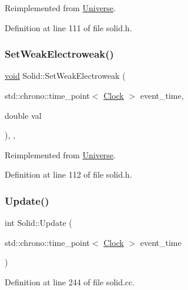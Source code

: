 Reimplemented from \mbox{\hyperlink{class_universe_a0f5cd04081b41ee931c0557dc397f6fb}{Universe}}.



Definition at line 111 of file solid.\+h.

\mbox{\label{class_solid_adb34befc66f8c681f3a85c44e0d00e3a}} 
\subsubsection{\texorpdfstring{Set\+Weak\+Electroweak()}{SetWeakElectroweak()}}
{\footnotesize\ttfamily \mbox{\hyperlink{glad_8h_a950fc91edb4504f62f1c577bf4727c29}{void}} Solid\+::\+Set\+Weak\+Electroweak (\begin{DoxyParamCaption}\item[{std\+::chrono\+::time\+\_\+point$<$ \mbox{\hyperlink{universe_8h_a0ef8d951d1ca5ab3cfaf7ab4c7a6fd80}{Clock}} $>$}]{event\+\_\+time,  }\item[{double}]{val }\end{DoxyParamCaption})\hspace{0.3cm}{\ttfamily [inline]}, {\ttfamily [final]}, {\ttfamily [virtual]}}



Reimplemented from \mbox{\hyperlink{class_universe_a2d3d642bfdc863248e93535832fa4b00}{Universe}}.



Definition at line 112 of file solid.\+h.

\mbox{\label{class_solid_a248a5eab9fa0c584af7cdec2f86dc3a3}} 
\subsubsection{\texorpdfstring{Update()}{Update()}}
{\footnotesize\ttfamily int Solid\+::\+Update (\begin{DoxyParamCaption}\item[{std\+::chrono\+::time\+\_\+point$<$ \mbox{\hyperlink{universe_8h_a0ef8d951d1ca5ab3cfaf7ab4c7a6fd80}{Clock}} $>$}]{event\+\_\+time }\end{DoxyParamCaption})}



Definition at line 244 of file solid.\+cc.

